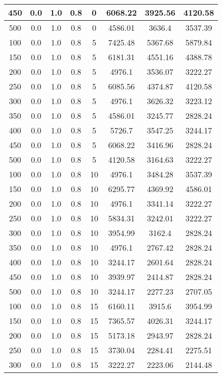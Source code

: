 \documentclass[a4paper, 12pt]{extreport}
\begin{document}
\begin{itemize}
\begin{longtable}{|c|c|c|c|c|c|c|c|}
			450 & 0.0 & 1.0 & 0.8 & 0 & 6068.22 & 3925.56 & 4120.58 \\\hline
			500 & 0.0 & 1.0 & 0.8 & 0 & 4586.01 & 3636.4 & 3537.39 \\\hline
			100 & 0.0 & 1.0 & 0.8 & 5 & 7425.48 & 5367.68 & 5879.84 \\\hline
			150 & 0.0 & 1.0 & 0.8 & 5 & 6181.31 & 4551.16 & 4388.78 \\\hline
			200 & 0.0 & 1.0 & 0.8 & 5 & 4976.1 & 3536.07 & 3222.27 \\\hline
			250 & 0.0 & 1.0 & 0.8 & 5 & 6085.56 & 4374.87 & 4120.58 \\\hline
			300 & 0.0 & 1.0 & 0.8 & 5 & 4976.1 & 3626.32 & 3223.12 \\\hline
			350 & 0.0 & 1.0 & 0.8 & 5 & 4586.01 & 3245.77 & 2828.24 \\\hline
			400 & 0.0 & 1.0 & 0.8 & 5 & 5726.7 & 3547.25 & 3244.17 \\\hline
			450 & 0.0 & 1.0 & 0.8 & 5 & 6068.22 & 3416.96 & 2828.24 \\\hline
			500 & 0.0 & 1.0 & 0.8 & 5 & 4120.58 & 3164.63 & 3222.27 \\\hline
			100 & 0.0 & 1.0 & 0.8 & 10 & 4976.1 & 3484.28 & 3537.39 \\\hline
			150 & 0.0 & 1.0 & 0.8 & 10 & 6295.77 & 4369.92 & 4586.01 \\\hline
			200 & 0.0 & 1.0 & 0.8 & 10 & 4976.1 & 3341.14 & 3222.27 \\\hline
			250 & 0.0 & 1.0 & 0.8 & 10 & 5834.31 & 3242.01 & 3222.27 \\\hline
			300 & 0.0 & 1.0 & 0.8 & 10 & 3954.99 & 3162.4 & 2828.24 \\\hline
			350 & 0.0 & 1.0 & 0.8 & 10 & 4976.1 & 2767.42 & 2828.24 \\\hline
			400 & 0.0 & 1.0 & 0.8 & 10 & 3244.17 & 2601.64 & 2828.24 \\\hline
			450 & 0.0 & 1.0 & 0.8 & 10 & 3939.97 & 2414.87 & 2828.24 \\\hline
			500 & 0.0 & 1.0 & 0.8 & 10 & 3244.17 & 2277.23 & 2707.05 \\\hline
			100 & 0.0 & 1.0 & 0.8 & 15 & 6160.11 & 3915.6 & 3954.99 \\\hline
			150 & 0.0 & 1.0 & 0.8 & 15 & 7365.57 & 4026.31 & 3244.17 \\\hline
			200 & 0.0 & 1.0 & 0.8 & 15 & 5173.18 & 2943.97 & 2828.24 \\\hline
			250 & 0.0 & 1.0 & 0.8 & 15 & 3730.04 & 2284.41 & 2275.51 \\\hline
			300 & 0.0 & 1.0 & 0.8 & 15 & 3222.27 & 2223.06 & 2144.48 \\\hline

\end{longtable}
\end{itemize}
\end{document}

